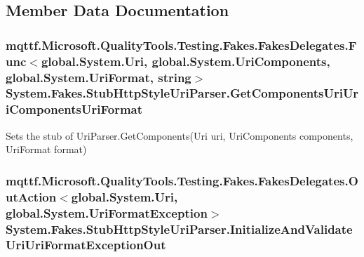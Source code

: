 \subsection{Member Data Documentation}
\hypertarget{class_system_1_1_fakes_1_1_stub_http_style_uri_parser_aa5be7e843d3a46458ad70009ab3b7f71}{
\subsubsection[{Get\-Components\-Uri\-Uri\-Components\-Uri\-Format}]{\setlength{\rightskip}{0pt plus 5cm}mqttf.\-Microsoft.\-Quality\-Tools.\-Testing.\-Fakes.\-Fakes\-Delegates.\-Func$<$global.\-System.\-Uri, global.\-System.\-Uri\-Components, global.\-System.\-Uri\-Format, string$>$ System.\-Fakes.\-Stub\-Http\-Style\-Uri\-Parser.\-Get\-Components\-Uri\-Uri\-Components\-Uri\-Format}}\label{class_system_1_1_fakes_1_1_stub_http_style_uri_parser_aa5be7e843d3a46458ad70009ab3b7f71}


Sets the stub of Uri\-Parser.\-Get\-Components(\-Uri uri, Uri\-Components components, Uri\-Format format)

\hypertarget{class_system_1_1_fakes_1_1_stub_http_style_uri_parser_aecfa6e93f2493b7a1ca00f6c798fc5ce}{
\subsubsection[{Initialize\-And\-Validate\-Uri\-Uri\-Format\-Exception\-Out}]{\setlength{\rightskip}{0pt plus 5cm}mqttf.\-Microsoft.\-Quality\-Tools.\-Testing.\-Fakes.\-Fakes\-Delegates.\-Out\-Action$<$global.\-System.\-Uri, global.\-System.\-Uri\-Format\-Exception$>$ System.\-Fakes.\-Stub\-Http\-Style\-Uri\-Parser.\-Initialize\-And\-Validate\-Uri\-Uri\-Format\-Exception\-Out}}\label{class_system_1_1_fakes_1_1_stub_http_style_uri_parser_aecfa6e93f2493b7a1ca00f6c798fc5ce}


